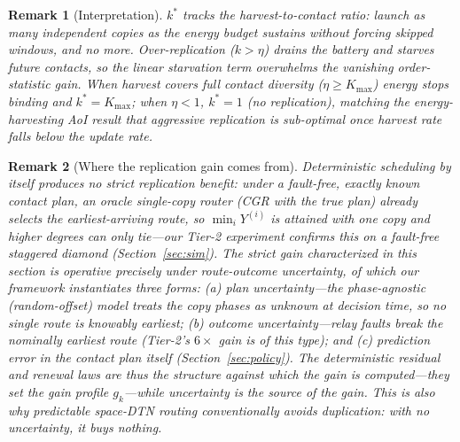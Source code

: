 \documentclass[twocolumn,3p,times,procedia]{elsarticle}
\newtheorem{remark}{Remark}
\newcommand{\kstar}{k^{\ast}}
\begin{document}
\begin{remark}[Interpretation]
$\kstar$ tracks the harvest-to-contact ratio: launch as many independent
copies as the energy budget sustains without forcing skipped windows, and
no more. Over-replication ($k>\eta$) drains the battery and starves
future contacts, so the linear starvation term overwhelms the vanishing
order-statistic gain. When harvest covers full contact diversity
($\eta\ge K_{\max}$) energy stops binding and $\kstar=K_{\max}$; when
$\eta<1$, $\kstar=1$ (no replication), matching the energy-harvesting AoI
result that aggressive replication is sub-optimal once harvest rate falls
below the update rate.
\end{remark}

\begin{remark}[Where the replication gain comes from]
\label{rem:uncertainty}
Deterministic scheduling by itself produces \emph{no} strict replication
benefit: under a fault-free, exactly known contact plan, an oracle
single-copy router (CGR with the true plan) already selects the
earliest-arriving route, so $\min_i Y^{(i)}$ is attained with one copy
and higher degrees can only \emph{tie}---our Tier-2 experiment confirms
this on a fault-free staggered diamond (Section~\ref{sec:sim}). The
strict gain characterized in this section is operative precisely under
\emph{route-outcome uncertainty}, of which our framework instantiates
three forms: (a) \emph{plan uncertainty}---the phase-agnostic
(random-offset) model treats the copy phases as unknown at decision
time, so no single route is knowably earliest; (b) \emph{outcome
uncertainty}---relay faults break the nominally earliest route
(Tier-2's $6\times$ gain is of this type); and (c) \emph{prediction
error} in the contact plan itself (Section~\ref{sec:policy}). The
deterministic residual and renewal laws are thus the \emph{structure}
against which the gain is computed---they set the gain profile
$g_k$---while uncertainty is the \emph{source} of the gain. This is
also why predictable space-DTN routing conventionally avoids
duplication: with no uncertainty, it buys nothing.
\end{remark}
\end{document}
